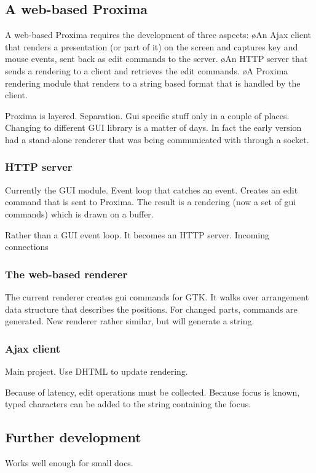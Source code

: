 \documentclass[10pt]{article}
\begin{document}
\subsection{A web-based Proxima}

A web-based Proxima requires the development of three aspects:
\bl
\o An Ajax client that renders a presentation (or part of it) on the screen and captures key and mouse events, sent back as edit commands to the server.
\o An HTTP server that sends a rendering to a client and retrieves the edit commands.
\o A Proxima rendering module that renders to a string based format that is handled by the client.
\el

Proxima is layered. Separation. Gui specific stuff only in a couple of places. Changing to different GUI library is a matter of days. In fact the early version had a stand-alone renderer that was being communicated with through a socket.

\subsubsection{HTTP server}

Currently the GUI module. Event loop that catches an event. Creates an edit command that is sent to Proxima. The result is a rendering (now a set of gui commands) which is drawn on a buffer.

Rather than a GUI event loop. It becomes an HTTP server. Incoming connections
 
\subsubsection{The web-based renderer}
The current renderer creates gui commands for GTK. It walks over arrangement data structure that describes the positions. For changed parts, commands are generated. New renderer rather similar, but will generate a string. 

\subsubsection{Ajax client}

Main project. Use DHTML to update rendering.

Because of latency, edit operations must be collected. Because focus is known, typed characters can be added to the string containing the focus.

\subsection{Further development}
Works well enough for small docs. 
\end{document}
